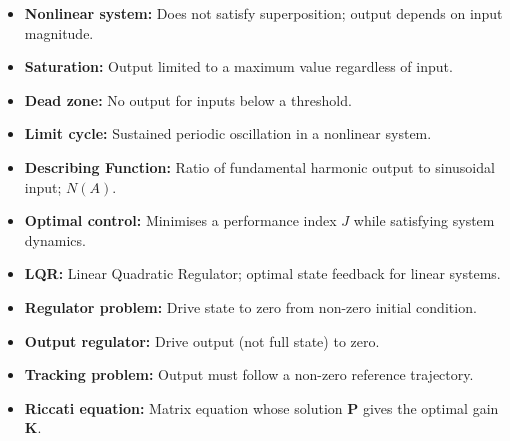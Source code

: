 \documentclass[12pt,a4paper]{article}
\begin{document}
\begin{tcolorbox}[defbox, title={\textbf{One-Line Definitions}}]
\begin{itemize}[leftmargin=*, itemsep=3pt, topsep=0pt]
  \item \textbf{Nonlinear system:} Does not satisfy superposition; output depends on input magnitude.
  \item \textbf{Saturation:} Output limited to a maximum value regardless of input.
  \item \textbf{Dead zone:} No output for inputs below a threshold.
  \item \textbf{Limit cycle:} Sustained periodic oscillation in a nonlinear system.
  \item \textbf{Describing Function:} Ratio of fundamental harmonic output to sinusoidal input; $N(A)$.
  \item \textbf{Optimal control:} Minimises a performance index $J$ while satisfying system dynamics.
  \item \textbf{LQR:} Linear Quadratic Regulator; optimal state feedback for linear systems.
  \item \textbf{Regulator problem:} Drive state to zero from non-zero initial condition.
  \item \textbf{Output regulator:} Drive output (not full state) to zero.
  \item \textbf{Tracking problem:} Output must follow a non-zero reference trajectory.
  \item \textbf{Riccati equation:} Matrix equation whose solution $\mathbf{P}$ gives the optimal gain $\mathbf{K}$.
\end{itemize}
\end{tcolorbox}

\vspace{5pt}
\end{document}
